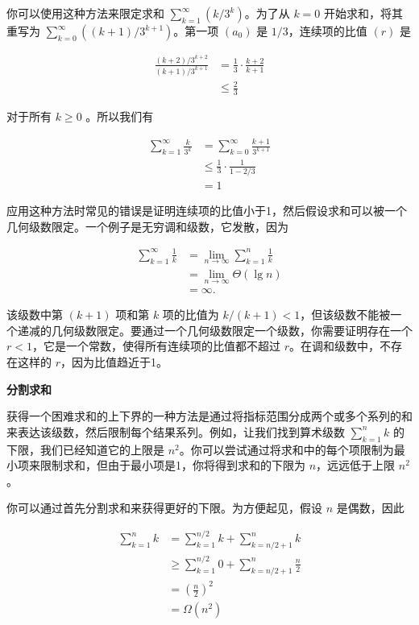 \documentclass[lang=cn,newtx,10pt,scheme=chinese]{elegantbook}
\begin{document}
你可以使用这种方法来限定求和 $\sum_{k=1}^{\infty}\left(k / 3^k\right)$。为了从 $k=0$ 开始求和，将其重写为 $\sum_{k=0}^{\infty}\left((k+1) / 3^{k+1}\right)$。第一项 $\left(a_0\right)$ 是 $1 / 3$，连续项的比值 $(r)$ 是

$$
\begin{aligned}
\frac{(k+2) / 3^{k+2}}{(k+1) / 3^{k+1}} & =\frac{1}{3} \cdot \frac{k+2}{k+1} \\
& \leq \frac{2}{3}
\end{aligned}
$$

对于所有 $k \geq 0$ 。所以我们有

$$
\begin{aligned}
\sum_{k=1}^{\infty} \frac{k}{3^k} & =\sum_{k=0}^{\infty} \frac{k+1}{3^{k+1}} \\
& \leq \frac{1}{3} \cdot \frac{1}{1-2 / 3} \\
& =1
\end{aligned}
$$

应用这种方法时常见的错误是证明连续项的比值小于1，然后假设求和可以被一个几何级数限定。一个例子是无穷调和级数，它发散，因为

$$
\begin{aligned}
\sum_{k=1}^{\infty} \frac{1}{k} & =\lim _{n \rightarrow \infty} \sum_{k=1}^n \frac{1}{k} \\
& =\lim _{n \rightarrow \infty} \Theta(\lg n) \\
& =\infty .
\end{aligned}
$$

该级数中第 $(k+1)$ 项和第 $k$ 项的比值为 $k /(k+1)<1$，但该级数不能被一个递减的几何级数限定。要通过一个几何级数限定一个级数，你需要证明存在一个 $r<1$，它是一个常数，使得所有连续项的比值都不超过 $r$。在调和级数中，不存在这样的 $r$，因为比值趋近于1。

\textbf{分割求和}

获得一个困难求和的上下界的一种方法是通过将指标范围分成两个或多个系列的和来表达该级数，然后限制每个结果系列。例如，让我们找到算术级数 $\sum_{k=1}^n k$ 的下限，我们已经知道它的上限是 $n^2$。你可以尝试通过将求和中的每个项限制为最小项来限制求和，但由于最小项是1，你将得到求和的下限为 $n$，远远低于上限 $n^2$。

你可以通过首先分割求和来获得更好的下限。为方便起见，假设 $n$ 是偶数，因此

$$
\begin{aligned}
\sum_{k=1}^n k & =\sum_{k=1}^{n / 2} k+\sum_{k=n / 2+1}^n k \\
& \geq \sum_{k=1}^{n / 2} 0+\sum_{k=n / 2+1}^n \frac{n}{2} \\
& =\left(\frac{n}{2}\right)^2 \\
& =\Omega\left(n^2\right)
\end{aligned}
$$
\end{document}

